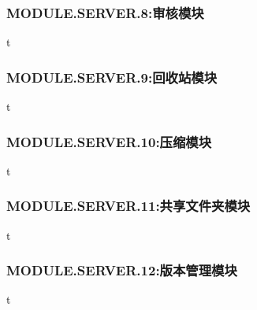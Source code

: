 \subsubsection{MODULE.SERVER.8:审核模块} 
t

\subsubsection{MODULE.SERVER.9:回收站模块}
t 

\subsubsection{MODULE.SERVER.10:压缩模块}
t

\subsubsection{MODULE.SERVER.11:共享文件夹模块}
t

\subsubsection{MODULE.SERVER.12:版本管理模块}
t






